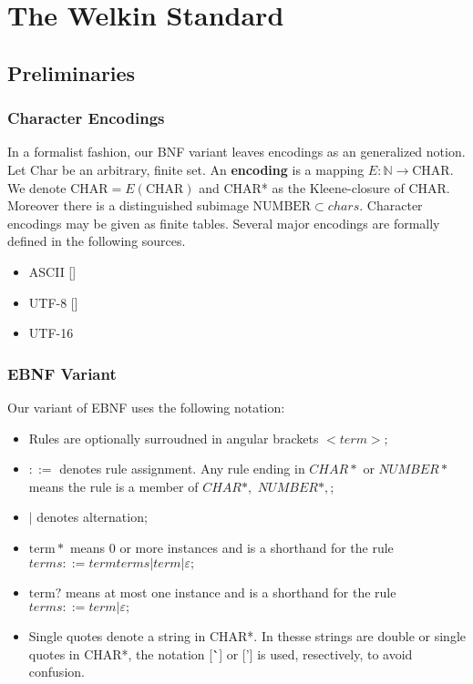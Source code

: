 

\chapter{The Welkin Standard}

\section{Preliminaries}

\newcommand*{\chars}{\mathrm{CHAR}}
\newcommand*{\bytes}{\mathrm{BYTES}}
\newcommand*{\numbers}{\mathrm{NUMBER}}
\newcommand*{\term}{\mathrm{term}}

\subsection{Character Encodings}
In a formalist fashion, our BNF variant leaves encodings as an generalized notion. Let Char be an arbitrary, finite set.
An \textbf{encoding} is a mapping $E : \mathbb{N} \to \chars.$
We denote $\chars = E(\chars)$ and CHAR* as the Kleene-closure of CHAR. Moreover there is a distinguished subimage $\numbers \subset chars.$ Character encodings may be given as finite tables. Several major encodings are formally defined in the following sources.
\begin{itemize}
	\item ASCII []
	\item UTF-8 []
	\item UTF-16
\end{itemize}

\subsection{EBNF Variant}
Our variant of EBNF uses the following notation:
\begin{itemize}
	\item Rules are optionally surroudned in angular brackets $<term>;$
	\item $::=$ denotes rule assignment. Any rule ending in $CHAR*$ or $NUMBER*$ means the rule is a member of $CHAR*,$ $NUMBER*,$;
	\item $|$ denotes alternation;
	\item $\term*$ means 0 or more instances and is a shorthand for the rule $terms ::= term terms | term | \varepsilon;$
	\item $\term?$ means at most one instance and is a shorthand for the rule $terms ::= term | \varepsilon;$
	\item Single quotes denote a string in CHAR*. In thesse strings are double or single quotes in CHAR*, the notation [\``] or ['] is used, resectively, to avoid confusion.
\end{itemize}

